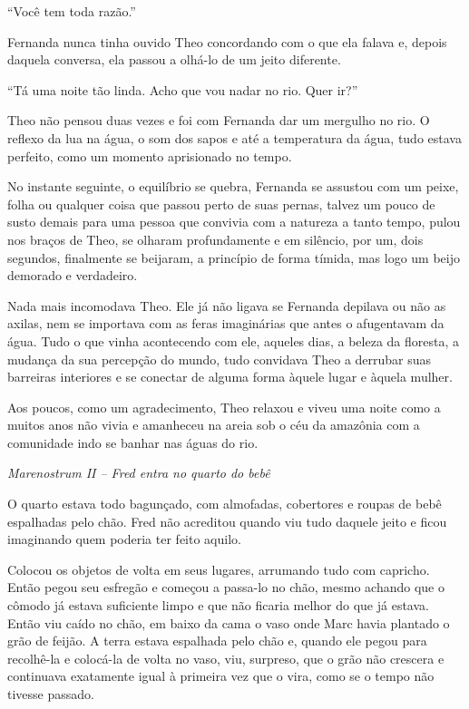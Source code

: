 ``Você tem toda razão.''

Fernanda nunca tinha ouvido Theo concordando com o que ela falava e,
depois daquela conversa, ela passou a olhá-lo de um jeito diferente.

``Tá uma noite tão linda. Acho que vou nadar no rio. Quer ir?''

Theo não pensou duas vezes e foi com Fernanda dar um mergulho no rio. O
reflexo da lua na água, o som dos sapos e até a temperatura da água,
tudo estava perfeito, como um momento aprisionado no tempo.

No instante seguinte, o equilíbrio se quebra, Fernanda se assustou com
um peixe, folha ou qualquer coisa que passou perto de suas pernas,
talvez um pouco de susto demais para uma pessoa que convivia com a
natureza a tanto tempo, pulou nos braços de Theo, se olharam
profundamente e em silêncio, por um, dois segundos, finalmente se
beijaram, a princípio de forma tímida, mas logo um beijo demorado e
verdadeiro.

Nada mais incomodava Theo. Ele já não ligava se Fernanda depilava ou não
as axilas, nem se importava com as feras imaginárias que antes o
afugentavam da água. Tudo o que vinha acontecendo com ele, aqueles dias,
a beleza da floresta, a mudança da sua percepção do mundo, tudo
convidava Theo a derrubar suas barreiras interiores e se conectar de
alguma forma àquele lugar e àquela mulher.

Aos poucos, como um agradecimento, Theo relaxou e viveu uma noite como a
muitos anos não vivia e amanheceu na areia sob o céu da amazônia com a
comunidade indo se banhar nas águas do rio.

\asterisc

\emph{Marenostrum II -- Fred entra no quarto do bebê}

O quarto estava todo bagunçado, com almofadas, cobertores e roupas de
bebê espalhadas pelo chão. Fred não acreditou quando viu tudo daquele
jeito e ficou imaginando quem poderia ter feito aquilo.

Colocou os objetos de volta em seus lugares, arrumando tudo com
capricho. Então pegou seu esfregão e começou a passa-lo no chão, mesmo
achando que o cômodo já estava suficiente limpo e que não ficaria melhor
do que já estava. Então viu caído no chão, em baixo da cama o vaso onde
Marc havia plantado o grão de feijão. A terra estava espalhada pelo chão
e, quando ele pegou para recolhê-la e colocá-la de volta no vaso, viu,
surpreso, que o grão não crescera e continuava exatamente igual à
primeira vez que o vira, como se o tempo não tivesse passado.


